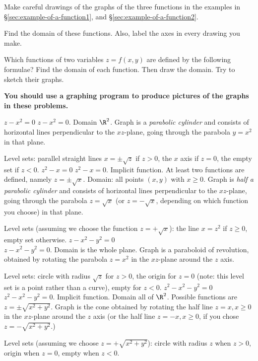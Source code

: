 \problem  Make careful drawings of the graphs of the three functions%
in the examples in \S\ref{sec:example-of-a-function1}, and
\S\ref{sec:example-of-a-function2}.


Find the domain of these functions.  Also, label the axes in every drawing
you make.

\problem\label{prb:some-functions}%
Which functions of two variables $z=f(x, y)$ are defined by the
following formulae?  Find the domain of each function.  Then draw the
domain.  Try to sketch their graphs.

\answer%
\textbf{You should use a graphing program to produce pictures
of the graphs in these problems.}
\endanswer

\subprob $z-x^2=0$\hspace{7em}
\answer%
$z-x^2=0$.
Domain $\R^2$.  Graph is a \emph{parabolic cylinder} and consists of
horizontal lines perpendicular to the $xz$-plane, going through the
parabola $y=x^2$ in that plane.

Level sets: parallel straight lines $x=\pm\sqrt{z}$ if $z>0$,
the $x$ axis if $z=0$, the empty set if $z<0$.
\endanswer
\subprob $z^2-x=0$\hspace{7em}
\answer%
$z^2-x=0$.
Implicit function.
At least two functions are defined, namely $z=\pm \sqrt{x}$.
Domain: all points $(x,y)$ with $x\ge 0$.
Graph is \emph{half a parabolic cylinder} and consists of
horizontal lines perpendicular to the $xz$-plane, going through the
parabola $z=\sqrt x$ (or $z=-\sqrt x$, depending on which function
you choose) in that plane.

Level sets (assuming we choose the function $z=+\sqrt{x}$):
the line $x=z^2$ if $z\ge0$, empty set otherwise.
\endanswer
\subprob $z-x^2-y^2=0$\\
\answer%
$z-x^2-y^2=0$.
Domain is the whole plane.
Graph is a paraboloid of revolution, obtained by rotating the
parabola $z=x^2$ in the $xz$-plane around the $z$ axis.

Level sets: circle with radius $\sqrt{z}$ for $z>0$,
the origin for $z=0$ (note: this level set is a point rather than a curve),
empty for $z<0$.
\endanswer
\subprob $z^2-x^2-y^2=0$
\answer%
$z^2-x^2-y^2=0$.
Implicit function.  Domain all of $\R^2$.
Possible functions are $z=\pm\sqrt{x^2+y^2}$.
Graph is the cone obtained by rotating the
half line $z=x, x\geq0$ in the $xz$-plane around the $z$ axis
(or the half line $z=-x, x\geq0$, if you chose $z=-\sqrt{x^2+y^2}$.)

Level sets (assuming we choose $z=+\sqrt{x^2+y^2}$):  circle with radius
$z$ when $z>0$, origin when $z=0$, empty when $z<0$.

